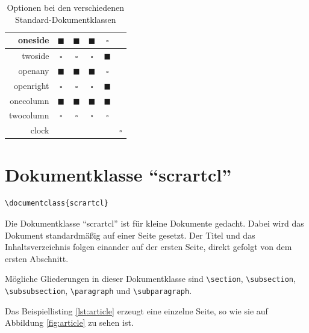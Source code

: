 \begin{table}[htbp]
\begin{center}
\begin{tabular}{r|c|c|c|c|c}
			oneside &
			$\blacksquare$ &
			$\blacksquare$ &
			$\blacksquare$ &
			$\square$ &
			\\ \hline
			twoside &
			$\square$ &
			$\square$ &
			$\square$ &
			$\blacksquare$ &
			\\ \hline
			openany &
			$\blacksquare$ &
			$\blacksquare$ &
			$\blacksquare$ &
			$\square$ &
			\\ \hline
			openright &
			$\square$ &
			$\square$ &
			$\square$ &
			$\blacksquare$ &
			\\ \hline
			onecolumn &
			$\blacksquare$ &
			$\blacksquare$ &
			$\blacksquare$ &
			$\blacksquare$ &
			\\ \hline
			twocolumn &
			$\square$ &
			$\square$ &
			$\square$ &
			$\square$ &
			\\ \hline
			clock & & & & & $\square$ \\
		\end{tabular}
	\end{center}

	\caption{Optionen bei den verschiedenen Standard-Dokumentklassen}
	\label{tab:classoptions}
\end{table}

\section{Dokumentklasse \enquote{scrartcl}}

\begin{lstlisting}
\documentclass{scrartcl}
\end{lstlisting}

Die Dokumentklasse \enquote{scrartcl} ist für kleine Dokumente gedacht. Dabei wird das Dokument standardmäßig auf einer Seite gesetzt. Der Titel und das Inhaltsverzeichnis folgen einander auf der ersten Seite, direkt gefolgt von dem ersten Abschnitt.

Mögliche Gliederungen in dieser Dokumentklasse sind \texttt{\textbackslash section}, \texttt{\textbackslash subsection},
\\
\texttt{\textbackslash subsubsection}, \texttt{\textbackslash paragraph} und \texttt{\textbackslash subparagraph}.

Das Beispiellisting \ref{lst:article} erzeugt eine einzelne Seite, so wie sie auf Abbildung \ref{fig:article} zu sehen ist.

